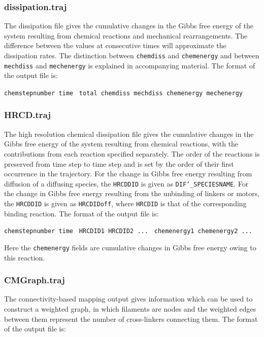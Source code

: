 \documentclass[11pt, oneside]{article}   	%
\begin{document}
\subsubsection{dissipation.traj}
The dissipation file gives the cumulative changes in the Gibbs free energy of the system resulting from chemical reactions and mechanical rearrangements.  The difference between the values at consecutive times will approximate the dissipation rates.  The distinction between \texttt{chemdiss} and \texttt{chemenergy} and between \texttt{mechdiss} and \texttt{mechenergy} is explained in accompanying material.  The format of the output file is:\newline

\noindent\texttt{chemstepnumber time }\newline
\texttt{total chemdiss mechdiss chemenergy mechenergy}\newline


\subsubsection{HRCD.traj}
The high resolution chemical dissipation file gives the cumulative changes in the Gibbs free energy of the system resulting from chemical reactions, with the contributions from each reaction specified separately.  The order of the reactions is preserved from time step to time step and is set by the order of their first occurrence in the trajectory.  For the change in Gibbs free energy resulting from diffusion of a diffusing species, the \texttt{HRCDDID} is given as \texttt{DIF\char`_SPECIESNAME}.  For the change in Gibbs free energy resulting from the unbinding of linkers or motors, the  \texttt{HRCDDID} is given as \texttt{HRCDIDoff}, where \texttt{HRCDID} is that of the corresponding binding reaction.  The format of the output file is:\newline

\noindent\texttt{chemstepnumber time }\newline
\texttt{HRCDID1 HRCDID2 ... }\newline
\texttt{chemenergy1 chemenergy2 ... }\newline

Here the \texttt{chemenergy} fields are cumulative changes in Gibbs free energy owing to this reaction.  

\subsubsection{CMGraph.traj}
The connectivity-based mapping output gives information which can be used to construct a weighted graph, in which filaments are nodes and the weighted edges between them represent the number of cross-linkers connecting them.  The format of the output file is:\newline
\end{document}
